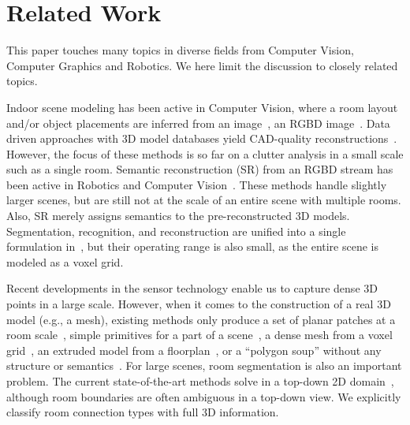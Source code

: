 \section{Related Work}
This paper touches many topics in diverse fields from Computer
Vision, Computer Graphics and Robotics.
We here limit the discussion to closely related topics.

Indoor scene modeling has been active in Computer Vision, where a room
layout and/or object placements are inferred from an
image~\cite{Hedau2009,fouhey2013data}, an RGBD
image~\cite{Hoiem13,cornel_indoor_13}. Data driven approaches
with 3D model databases yield CAD-quality
reconstructions~\cite{cad_matching_12,search_classify_12}. However, the
focus of these methods is so far on a clutter analysis in a small scale
such as a single room.
%
Semantic reconstruction (SR) from an RGBD stream has been active in
Robotics and Computer Vision~\cite{jia20133d,herbst2014toward}. These
methods handle slightly larger scenes, but are still not at the scale of
an entire scene with multiple rooms. Also, SR merely assigns semantics
to the pre-reconstructed 3D models. Segmentation, recognition, and
reconstruction are unified into a single formulation
in~\cite{hane2013joint}, but their operating range is also small, as the
entire scene is modeled as a voxel grid.

Recent developments in the sensor technology enable us to capture
dense 3D points in a large scale.
However, when it comes to the construction of a real 3D model (e.g., a
mesh), existing methods only produce a set of planar patches at a room
scale~\cite{xiong2013automatic}, simple primitives for a part of a
scene~\cite{mani_progress_monitoring}, a dense mesh from a voxel
grid~\cite{Turner2015}, an extruded model from a
floorplan~\cite{Turner2015}, or a ``polygon soup'' without any structure
or semantics~\cite{eccv_museum}.
%
%
For large scenes, room segmentation is also an important problem. The
current state-of-the-art methods solve in a top-down 2D
domain~\cite{Turner2015,Mura2014}, although room boundaries are often
ambiguous in a top-down view. We explicitly classify room connection
types with full 3D information.


